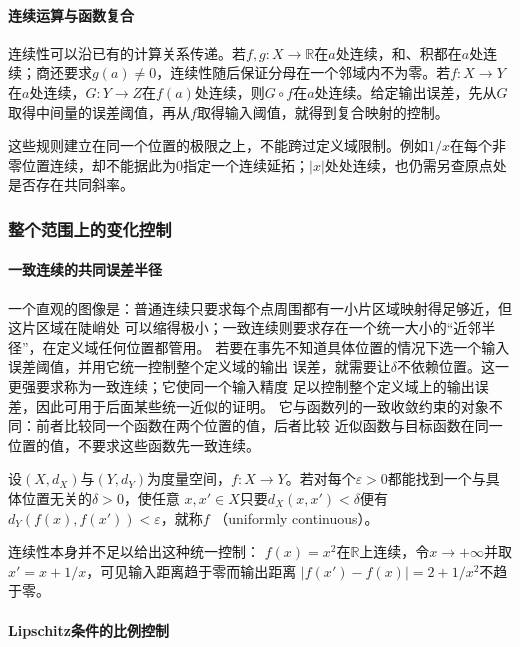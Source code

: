 \paragraph{连续运算与函数复合}

连续性可以沿已有的计算关系传递。若$f,g:X\to\mathbb R$在$a$处连续，和、积都在$a$处连续；商还要求$g(a)\neq0$，连续性随后保证分母在一个邻域内不为零。若$f:X\to Y$在$a$处连续，$G:Y\to Z$在$f(a)$处连续，则$G\circ f$在$a$处连续。给定输出误差，先从$G$取得中间量的误差阈值，再从$f$取得输入阈值，就得到复合映射的控制。

这些规则建立在同一个位置的极限之上，不能跨过定义域限制。例如$1/x$在每个非零位置连续，却不能据此为$0$指定一个连续延拓；$|x|$处处连续，也仍需另查原点处是否存在共同斜率。

\subsubsection{整个范围上的变化控制}

\paragraph{一致连续的共同误差半径}

一个直观的图像是：普通连续只要求每个点周围都有一小片区域映射得足够近，但这片区域在陡峭处
可以缩得极小；一致连续则要求存在一个统一大小的“近邻半径”，在定义域任何位置都管用。
若要在事先不知道具体位置的情况下选一个输入误差阈值，并用它统一控制整个定义域的输出
误差，就需要让$\delta$不依赖位置。这一更强要求称为一致连续；它使同一个输入精度
足以控制整个定义域上的输出误差，因此可用于后面某些统一近似的证明。
它与函数列的一致收敛约束的对象不同：前者比较同一个函数在两个位置的值，后者比较
近似函数与目标函数在同一位置的值，不要求这些函数先一致连续。
\begin{definition}[一致连续映射]
\label{def:analysis-uniform-continuity}
设$(X,d_X)$与$(Y,d_Y)$为度量空间，$f:X\to Y$。若对每个$\varepsilon>0$都能找到一个与具体位置无关的$\delta>0$，使任意
$x,x'\in X$只要$d_X(x,x')<\delta$便有
$d_Y(f(x),f(x'))<\varepsilon$，就称$f$
（uniformly continuous）。
\end{definition}
连续性本身并不足以给出这种统一控制：
$f(x)=x^2$在$\mathbb{R}$上连续，令$x\to+\infty$并取$x'=x+1/x$，可见输入距离趋于零而输出距离
$|f(x')-f(x)|=2+1/x^2$不趋于零。

\paragraph{Lipschitz条件的比例控制}


